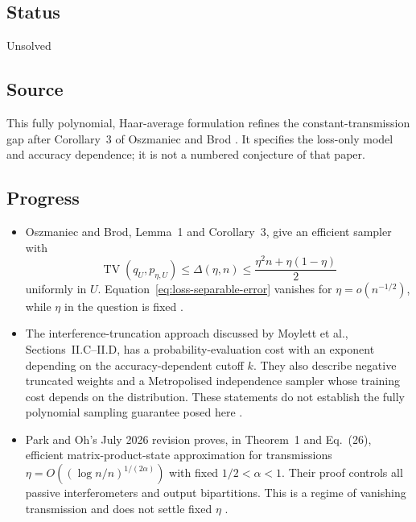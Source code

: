 \subsection*{Status}

Unsolved

\subsection*{Source}

This fully polynomial, Haar-average formulation refines the constant-transmission gap after Corollary~3 of Oszmaniec and Brod .
It specifies the loss-only model and accuracy dependence; it is not a numbered conjecture of that paper.

\subsection*{Progress}

\begin{itemize}
  \item Oszmaniec and Brod, Lemma~1 and Corollary~3, give an efficient sampler with
\begin{equation}
 \operatorname{TV}(q_U,p_{\eta,U})
 \leq\Delta(\eta,n)
 \leq\frac{\eta^2 n+\eta(1-\eta)}2
 \label{eq:loss-separable-error}
\end{equation}
uniformly in $U$.
Equation~\eqref{eq:loss-separable-error} vanishes for $\eta=o(n^{-1/2})$, while $\eta$ in the question is fixed .

  \item The interference-truncation approach discussed by Moylett et al., Sections~II.C--II.D, has a probability-evaluation cost with an exponent depending on the accuracy-dependent cutoff $k$.
They also describe negative truncated weights and a Metropolised independence sampler whose training cost depends on the distribution.
These statements do not establish the fully polynomial sampling guarantee posed here .

  \item Park and Oh's July 2026 revision proves, in Theorem~1 and Eq.~(26), efficient matrix-product-state approximation for transmissions
$\eta=O((\log n/n)^{1/(2\alpha)})$ with fixed $1/2<\alpha<1$.
Their proof controls all passive interferometers and output bipartitions.
This is a regime of vanishing transmission and does not settle fixed $\eta$ .
\end{itemize}

